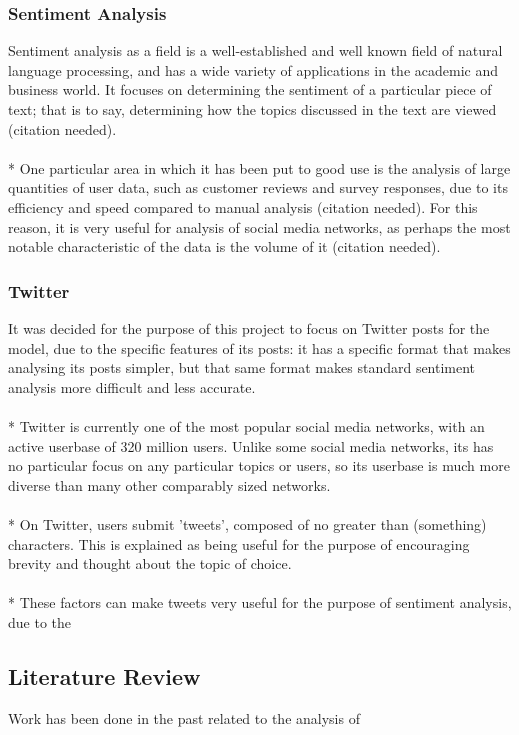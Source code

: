 \documentclass{acm_proc_article-sp}
\begin{document}
		\subsubsection{Sentiment Analysis}
		Sentiment analysis as a field is a well-established and well known field of natural language processing, and has a wide variety of applications in the academic and business world. It focuses on determining the sentiment of a particular piece of text; that is to say, determining how the topics discussed in the text are viewed (citation needed). \\
		\\*
		One particular area in which it has been put to good use is the analysis of large quantities of user data, such as customer reviews and survey responses, due to its efficiency and speed compared to manual analysis (citation needed). For this reason, it is very useful for analysis of social media networks, as perhaps the most notable characteristic of the data is the volume of it (citation needed).
		\subsubsection{Twitter}
		It was decided for the purpose of this project to focus on Twitter posts for the model, due to the specific features of its posts: it has a specific format that makes analysing its posts simpler, but that same format makes standard sentiment analysis more difficult and less accurate.\\
		\\*
		Twitter is currently one of the most popular social media networks, with an active userbase of 320 million users\cite{TwitAbt}. Unlike some social media networks, its has no particular focus on any particular topics or users, so its userbase is much more diverse than many other comparably sized networks.\\
		\\*
		On Twitter, users submit 'tweets', composed of no greater than (something) characters. This is explained as being useful for the purpose of encouraging brevity and thought about the topic of choice.\\
		\\*
		These factors can make tweets very useful for the purpose of sentiment analysis, due to the 
	\subsection{Literature Review}
	Work has been done in the past related to the analysis of 
\end{document}
